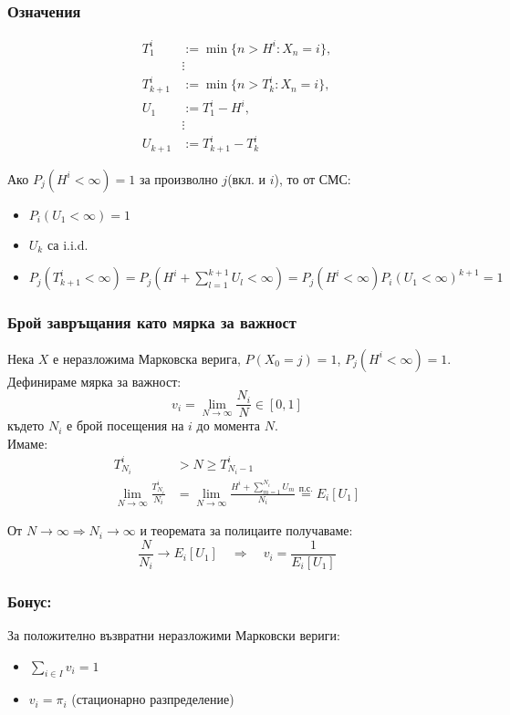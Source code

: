 \documentclass{article}
\begin{document}
\subsubsection*{Означения}
\begin{align*}
T_1^i &:= \min\{n > H^i : X_n = i\}, \\
&\vdots \\
T_{k+1}^i &:= \min\{n > T_k^i : X_n = i\}, \\
U_1 &:= T_1^i - H^i, \\
&\vdots \\
U_{k+1} &:= T_{k+1}^i - T_k^i
\end{align*}

Ако $P_j(H^i<\infty)=1$ за произволно $j$(вкл. и $i$), то от СМС:
\begin{itemize}
\item $P_i(U_1<\infty)=1$
\item $U_k$ са i.i.d.
\item $P_j(T_{k+1}^i<\infty) = P_j\left(H^i + \sum_{l=1}^{k+1} U_l < \infty\right) = P_j(H^i<\infty)P_i(U_1<\infty)^{k+1} = 1$
\end{itemize}

\subsubsection*{Брой завръщания като мярка за важност}
Нека $X$ е неразложима Марковска верига, $P(X_0=j)=1$, $P_j(H^i<\infty)=1$. \\

Дефинираме мярка за важност:
$$v_i = \lim_{N\to\infty} \frac{N_i}{N} \in [0,1]$$
където $N_i$ е брой посещения на $i$ до момента $N$. \\

Имаме:
\begin{align*}
T_{N_i}^i &> N \geq T_{N_i-1}^i \\
\lim_{N\to\infty} \frac{T_{N_i}^i}{N_i} &= \lim_{N\to\infty} \frac{H^i + \sum_{m=1}^{N_i} U_m}{N_i} \overset{\text{п.с.}}{=} E_i[U_1]
\end{align*}

От $N\to\infty \Rightarrow N_i\to\infty$ и теоремата за полицаите получаваме:
$$\frac{N}{N_i} \to E_i[U_1] \quad \Rightarrow \quad v_i = \frac{1}{E_i[U_1]}$$

\subsubsection*{Бонус:}
За положително възвратни неразложими Марковски вериги:
\begin{itemize}
\item $\sum_{i\in I} v_i = 1$
\item $v_i = \pi_i$ (стационарно разпределение)
\end{itemize}
\end{document}
